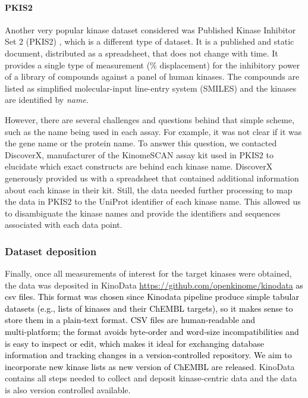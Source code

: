 \documentclass[9pt,lessons, pubversion]{livecoms}
\newcommand{\revision}[1]{\textcolor{black}{#1}}
\begin{document}
\paragraph{PKIS2}

Another very popular kinase dataset considered was Published Kinase Inhibitor Set 2 (PKIS2) \cite{drewry2017progress}, which is a different type of dataset. 
It is a published and static document, distributed as a spreadsheet, that does not change with time. It provides a single type of measurement (\% displacement) for the inhibitory power of a library of compounds against a panel of human kinases. The compounds are listed as simplified molecular-input line-entry system (SMILES) and the kinases are identified by \emph{name}. 

However, there are several challenges and questions behind that simple scheme, such as the name being used in each assay. For example, it was not clear if it was the gene name or the protein name. To answer this question, we contacted DiscoverX, manufacturer of the KinomeSCAN assay kit used in PKIS2 to elucidate which exact constructs are behind each kinase name. DiscoverX generously provided us with a spreadsheet that contained additional information about each kinase in their kit. 
Still, the data needed further processing to map the data in PKIS2 to the UniProt identifier of each kinase name. This allowed us to disambiguate the kinase names and provide the identifiers and sequences associated with each data point.

\subsubsection{Dataset deposition}

Finally, once all measurements of interest for the target kinases were obtained, the data was deposited in KinoData \url{https://github.com/openkinome/kinodata} \revision{as csv files. This format was chosen since Kinodata pipeline produce simple tabular datasets (e.g., lists of kinases and their ChEMBL targets), so it makes sense to store them in a plain‑text format. CSV files are human‑readable and multi‑platform; the format avoids byte‑order and word‑size incompatibilities and is easy to inspect or edit, which makes it ideal for exchanging database information and tracking changes in a version‑controlled repository. We aim to incorporate new kinase lists as new version of ChEMBL are released}. KinoData contains all steps needed to collect and deposit kinase-centric data and the data is also version controlled available.
\end{document}

